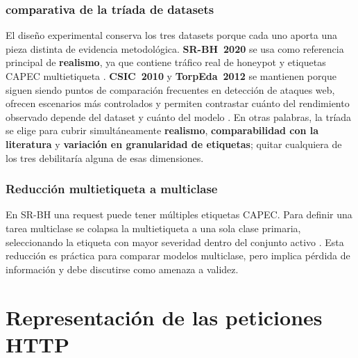 \documentclass[12pt,oneside]{report}
\begin{document}
\subsection{comparativa de la tríada de datasets}
El diseño experimental conserva los tres datasets porque cada uno aporta una pieza distinta de evidencia metodológica. \textbf{SR-BH~2020} se usa como referencia principal de \textbf{realismo}, ya que contiene tráfico real de honeypot y etiquetas CAPEC multietiqueta \cite{srbh_dataverse,srbh_paper}. \textbf{CSIC~2010} y \textbf{TorpEda~2012} se mantienen porque siguen siendo puntos de comparación frecuentes en detección de ataques web, ofrecen escenarios más controlados y permiten contrastar cuánto del rendimiento observado depende del dataset y cuánto del modelo \cite{csic2010_impact,csic2010_doc,torpeda_2012}. En otras palabras, la tríada se elige para cubrir simultáneamente \textbf{realismo}, \textbf{comparabilidad con la literatura} y \textbf{variación en granularidad de etiquetas}; quitar cualquiera de los tres debilitaría alguna de esas dimensiones.

\subsection{Reducción multietiqueta a multiclase}
En SR-BH una request puede tener múltiples etiquetas CAPEC. Para definir una tarea multiclase se colapsa la multietiqueta a una sola clase primaria, seleccionando la etiqueta con mayor severidad dentro del conjunto activo \cite{capec_schema_docs,capec_schema_desc}. Esta reducción es práctica para comparar modelos multiclase, pero implica pérdida de información y debe discutirse como amenaza a validez.

\chapter{Representación de las peticiones HTTP}
\end{document}
